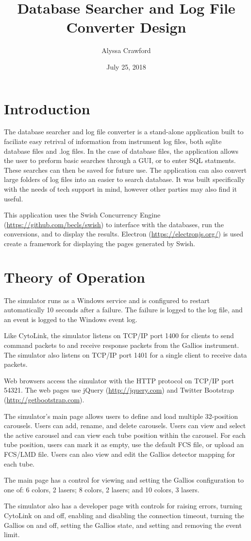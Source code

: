 \documentclass[letterpaper,11pt,twoside,final]{article}
\begin{document}
\title{Database Searcher and Log File Converter Design}
\author{Alyssa Crawford}
\date{July 25, 2018}
\coverpage

\section*{Introduction}
The database searcher and log file converter is a stand-alone
application built to faciliate easy retrival of information from instrument
log files, both sqlite database files and .log files. In the case of
database files, the application allows the user to preform basic
searches through a GUI, or to enter SQL statments. These searches can
then be saved for future use. The application can
also convert large folders of log files into an easier to search database.
It was built specifically with the
needs of tech support in mind, however other parties may also find it
useful.

This application uses the Swish Concurrency Engine (\url{https://github.com/becls/swish}) to interface with
the databases, run the conversions, and to display the
results. Electron (\url{https://electronjs.org/}) is used create a framework for displaying the pages generated by Swish.  

\section*{Theory of Operation}

The simulator runs as a Windows service and is configured to restart
automatically 10 seconds after a failure. The failure is logged to the
log file, and an event is logged to the Windows event log.

Like CytoLink, the simulator listens on TCP/IP port 1400 for clients
to send command packets to and receive response packets from the
Gallios instrument. The simulator also listens on TCP/IP port 1401 for
a single client to receive data packets.

Web browsers access the simulator with the HTTP protocol on TCP/IP
port 54321. The web pages use jQuery (\url{http://jquery.com}) and
Twitter Bootstrap (\url{http://getbootstrap.com}).

The simulator's main page allows users to define and load multiple
32-position carousels. Users can add, rename, and delete
carousels. Users can view and select the active carousel and can view
each tube position within the carousel. For each tube position, users
can mark it as empty, use the default FCS file, or upload an FCS/LMD
file. Users can also view and edit the Gallios detector mapping for
each tube.

The main page has a control for viewing and setting the Gallios
configuration to one of: 6 colors, 2 lasers; 8 colors, 2 lasers; and
10 colors, 3 lasers.

The simulator also has a developer page with controls for raising
errors, turning CytoLink on and off, enabling and disabling the
connection timeout, turning the Gallios on and off, setting the
Gallios state, and setting and removing the event limit.
\end{document}
